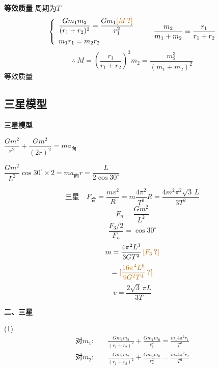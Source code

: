\textbf{等效质量}
周期为$T$
\[
\left\{\begin{array}{l}
\dfrac{Gm_1m_2}{(r_1+r_2)^{2}}=\dfrac{Gm_1\text{\unclear{$M$}}}{r_1^{2}}\\[10pt]
m_1r_1=m_2r_2
\end{array}\right.
\qquad \frac{m_2}{m_1+m_2}=\frac{r_1}{r_1+r_2}
\] %
\[ \therefore\ M=\left(\frac{r_1}{r_1+r_2}\right)^{3}m_2=\frac{m_2^{3}}{(m_1+m_2)^{2}} \] %
等效质量

\subsection{三星模型}
\textbf{三星模型}


$\dfrac{Gm^{2}}{r^{2}}+\dfrac{Gm^{2}}{(2r)^{2}}=ma_{\text{向}}$


$\dfrac{Gm^{2}}{L^{2}}\cos30^{\circ}\times2=ma_{\text{向}}$\qquad $r=\dfrac{L}{2\cos30^{\circ}}$

\[ \text{三星}\quad F_{\text{合}}=\dfrac{mv^{2}}{R}=m\dfrac{4\pi^{2}}{T^{2}}R=\dfrac{4m^{2}\pi^{2}\sqrt{3}\,L}{3T^{2}} \]
\[ F_{n}=\dfrac{Gm^{2}}{L^{2}} \]
\[ \dfrac{F_{3}/2}{F_{n}}=\cos30^\circ \]
\[ m=\dfrac{4\pi^{2}L^{3}}{3GT^{2}}\,\unclear{F_{3}} \]
\[ =\unclear{\dfrac{16\pi^{4}L^{6}}{9G^{2}T^{4}}} \]
\[ v=\dfrac{2\sqrt{3}\,\pi L}{3T} \]

\textbf{二、三星}

(1)
\[
\begin{aligned}
\text{对}m_1:&\quad \frac{Gm_1m_2}{(r_1+r_2)^{2}}+\frac{Gm_1m_0}{r_1^{2}}=\frac{m_{1}4\pi^{2}r_1}{T^{2}}\\[6pt]
\text{对}m_2:&\quad \frac{Gm_1m_2}{(r_1+r_2)^{2}}+\frac{Gm_2m_0}{r_2^{2}}=\frac{m_{2}4\pi^{2}r_2}{T^{2}}
\end{aligned}
\] %

